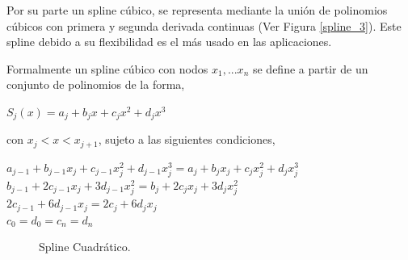 \hspace{0.4cm} Por su parte un spline c\'ubico, se representa mediante la uni\'on de polinomios c\'ubicos con primera y segunda derivada continuas (Ver Figura \ref{spline_3}). Este spline debido a su flexibilidad es el m\'as usado en las aplicaciones.


\hspace{0.4cm}Formalmente un spline c\'ubico con nodos $x_{1},...x_{n}$ se define a partir de un conjunto de polinomios de la forma,\\

\begin{center}

$\displaystyle{S_{j}(x) = a_{j} + b_{j}x +c_{j}x^2 +d_{j}x^3}$
\end{center}


\vspace{0.5cm}

\noindent con $x_{j}<x<x_{j+1}$, sujeto a las siguientes condiciones,\\

\newpage

\begin{center}

$\displaystyle{a_{j-1} + b_{j-1}x_{j} +c_{j-1}x_{j}^2 +d_{j-1}x_{j}^3 = a_{j} + b_{j}x_{j} +c_{j}x_{j}^2 +d_{j}x_{j}^3}$\\
$\displaystyle{ b_{j-1} +2c_{j-1}x_{j} +3d_{j-1}x_{j}^2 = b_{j} +2c_{j}x_{j} +3d_{j}x_{j}^2}$\\
$\displaystyle{ 2c_{j-1} +6d_{j-1}x_{j} = 2c_{j} +6d_{j}x_{j}}$\\
$\displaystyle{ c_{0} = d_{0} = c_{n} =d_{n}}$

\end{center}

\begin{figure}[h]
\caption{Spline Cuadr\'atico.}
\label{spline_c}
\end{figure}

